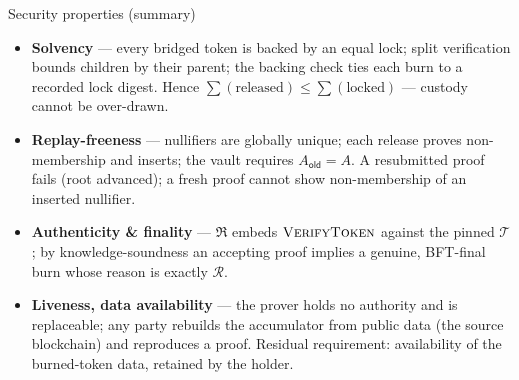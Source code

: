 \documentclass[aspectratio=169,10pt]{beamer}
\newcommand{\VerifyToken}{\textsc{VerifyToken}}
\newcommand{\trust}{\mathcal{T}}
\newcommand{\accum}{A}
\newcommand{\defn}[2]{\textbf{#1} --- #2}
\begin{document}
\begin{frame}{Security properties (summary)}
\begin{itemize}\small
  \item \defn{Solvency}{every bridged token is backed by an equal lock; split
        verification bounds children by their parent; the backing check ties each
        burn to a recorded lock digest. Hence $\sum(\text{released})\le
        \sum(\text{locked})$ --- custody cannot be over-drawn.}
  \item \defn{Replay-freeness}{nullifiers are globally unique; each release proves
        non-membership and inserts; the vault requires $\accum_\mathsf{old}=\accum$.
        A resubmitted proof fails (root advanced); a fresh proof cannot show
        non-membership of an inserted nullifier.}
  \item \defn{Authenticity \& finality}{$\mathfrak{R}$ embeds $\VerifyToken{}$
        against the pinned $\trust$; by knowledge-soundness an accepting proof
        implies a genuine, BFT-final burn whose reason is exactly $\mathcal{R}$.}
  \item \defn{Liveness, data availability}{the prover holds no authority and is replaceable; any party
        rebuilds the accumulator from public data (the source blockchain) and reproduces a proof. Residual
        requirement: availability of the burned-token data, retained by the holder.}
\end{itemize}
\end{frame}
\end{document}

